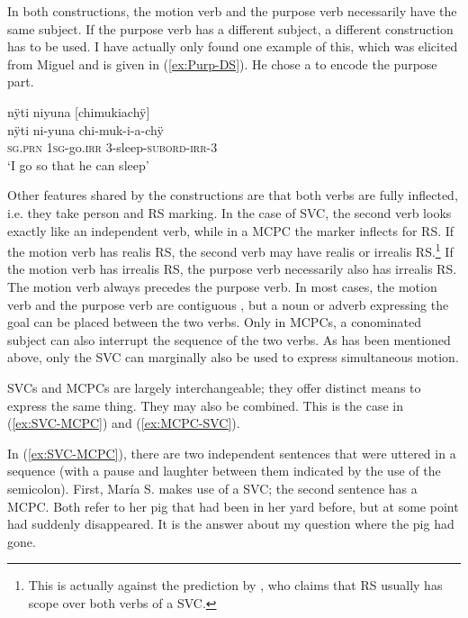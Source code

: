 In both constructions, the motion verb and the purpose verb necessarily have the same subject. If the purpose verb has a different subject, a different construction has to be used. I have actually only found one example of this, which was elicited from Miguel and is given in (\ref{ex:Purp-DS}). He chose a  to encode the purpose part.

\ea\label{ex:Purp-DS}
\begingl
\glpreamble nÿti niyuna \textup{[}chimukiachÿ\textup{]}\\
\gla nÿti ni-yuna chi-muk-i-a-chÿ\\
\textsc{sg.prn} 1\textsc{sg}-go.\textsc{irr} 3-sleep-\textsc{subord}-\textsc{irr}-3\\
\glft ‘I go so that he can sleep’
\endgl
\trailingcitation{[mxx-e160811sd.311-312]}
\xe


Other features shared by the constructions are that both verbs are fully inflected, i.e. they take person and RS marking. In the case of SVC, the second verb looks exactly like an independent verb, while in a MCPC the  marker inflects for RS. If the motion verb has realis RS, the second verb may have realis or irrealis RS.\footnote{This is actually against the prediction by \citet[3]{Aikhenvald2018}, who claims that RS usually has scope over both verbs of a SVC.} If the motion verb has irrealis RS, the purpose verb necessarily also has irrealis RS. The motion verb always precedes the purpose verb. In most cases, the motion verb and the purpose verb are contiguous \citep[cf.][37]{Aikhenvald2006}, but a noun or adverb expressing the goal can be placed between the two verbs. Only in MCPCs, a conominated subject can also interrupt the sequence of the two verbs. As has been mentioned above, only the SVC can marginally also be used to express simultaneous motion.

SVCs and MCPCs are largely interchangeable; they offer distinct means to express the same thing. They may also be combined. This is the case in (\ref{ex:SVC-MCPC}) and (\ref{ex:MCPC-SVC}). 

In (\ref{ex:SVC-MCPC}), there are two independent sentences that were uttered in a sequence (with a pause and laughter between them indicated by the use of the semicolon). First, María S. makes use of a SVC; the second sentence has a MCPC. Both refer to her pig that had been in her yard before, but at some point had suddenly disappeared. It is the answer about my question where the pig had gone. 

